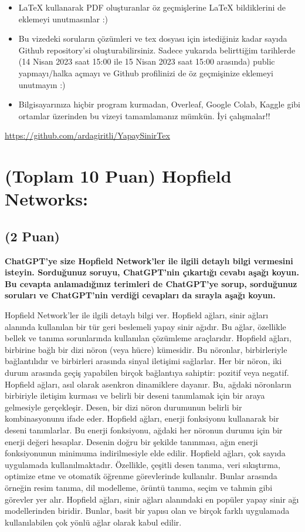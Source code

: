 \documentclass[11pt]{article}
\begin{document}
\begin{itemize}
    \item LaTeX kullanarak PDF oluşturanlar öz geçmişlerine LaTeX bildiklerini de eklemeyi unutmasınlar :)
    \item Bu vizedeki soruların çözümleri ve tex dosyası için istediğiniz kadar sayıda Github repository'si oluşturabilirsiniz. Sadece yukarıda belirttiğim tarihlerde (14 Nisan 2023 saat 15:00 ile 15 Nisan 2023 saat 15:00 arasında) public yapmayı/halka açmayı ve Github profilinizi de öz geçmişinize eklemeyi unutmayın :)
    \item Bilgisayarınıza hiçbir program kurmadan, Overleaf, Google Colab, Kaggle gibi ortamlar üzerinden bu vizeyi tamamlamanız mümkün. İyi çalışmalar!!
\end{itemize}

\url{https://github.com/ardagiritli/YapaySinirTex}

\newpage
\section{(Toplam 10 Puan) Hopfield Networks:}

\subsection{(2 Puan)} \textbf{ChatGPT’ye size Hopfield Network’ler ile ilgili detaylı bilgi vermesini isteyin. Sorduğunuz soruyu, ChatGPT'nin çıkartığı cevabı aşağı koyun. Bu cevapta anlamadığınız terimleri de ChatGPT’ye sorup, sorduğunuz soruları ve ChatGPT’nin verdiği cevapları da sırayla aşağı koyun.}

Hopfield Network’ler ile ilgili detaylı bilgi ver.
Hopfield ağları, sinir ağları alanında kullanılan bir tür geri beslemeli yapay sinir ağıdır. Bu ağlar, özellikle bellek ve tanıma sorunlarında kullanılan çözümleme araçlarıdır.
Hopfield ağları, birbirine bağlı bir dizi nöron (veya hücre) kümesidir. Bu nöronlar, birbirleriyle bağlantılıdır ve birbirleri arasında sinyal iletişimi sağlarlar. Her bir nöron, iki durum arasında geçiş yapabilen birçok bağlantıya sahiptir: pozitif veya negatif.
Hopfield ağları, asıl olarak asenkron dinamiklere dayanır. Bu, ağdaki nöronların birbiriyle iletişim kurması ve belirli bir deseni tanımlamak için bir araya gelmesiyle gerçekleşir. Desen, bir dizi nöron durumunun belirli bir kombinasyonunu ifade eder.
Hopfield ağları, enerji fonksiyonu kullanarak bir deseni tanımlarlar. Bu enerji fonksiyonu, ağdaki her nöronun durumu için bir enerji değeri hesaplar. Desenin doğru bir şekilde tanınması, ağın enerji fonksiyonunun minimuma indirilmesiyle elde edilir.
Hopfield ağları, çok sayıda uygulamada kullanılmaktadır. Özellikle, çeşitli desen tanıma, veri sıkıştırma, optimize etme ve otomatik öğrenme görevlerinde kullanılır. Bunlar arasında örneğin resim tanıma, dil modelleme, örüntü tanıma, seçim ve tahmin gibi görevler yer alır.
Hopfield ağları, sinir ağları alanındaki en popüler yapay sinir ağı modellerinden biridir. Bunlar, basit bir yapısı olan ve birçok farklı uygulamada kullanılabilen çok yönlü ağlar olarak kabul edilir.
\end{document}
